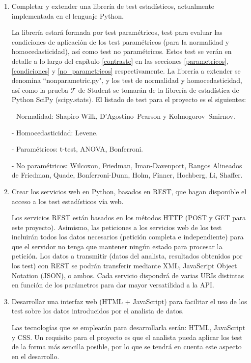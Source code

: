 \begin{enumerate}
\item Completar y extender una librería de test estadísticos, actualmente implementada en el lenguaje Python.

La librería estará formada por test paramétricos, test para evaluar las condiciones de aplicación de los test
paramétricos (para la normalidad y homocedasticidad), así como test no paramétricos. Estos test se verán en
detalle a lo largo del capítulo \ref{contraste} en las secciones \ref{parametricos}, \ref{condiciones} y
\ref{no_parametricos} respectivamente. La librería a extender se denomina ``nonparametric.py", y los test de
normalidad y homocedasticidad, así como la prueba  $\mathcal{T}$ de Student se tomarán de la librería de estadística
de Python SciPy (scipy.stats). El listado de test para el proyecto es el siguientes:

- Normalidad: Shapiro-Wilk, D’Agostino–Pearson y Kolmogorov–Smirnov.

- Homocedasticidad: Levene.

- Paramétricos: t-test, ANOVA, Bonferroni.

- No paramétricos: Wilcoxon, Friedman, Iman-Davenport, Rangos Alineados de Friedman, Quade, Bonferroni-Dunn,
Holm, Finner, Hochberg, Li, Shaffer.

\item Crear los servicios web en Python, basados en REST, que hagan disponible el acceso a los
test estadísticos vía web.

Los servicios REST están basados en los métodos HTTP (POST y GET para este proyecto). Asimismo, las peticiones
a los servicios web de los test incluirán todos los datos necesarios (petición completa e independiente) para
que el servidor no tenga que mantener ningún estado para procesar la petición. Los datos a transmitir (datos del
analista, resultados obtenidos por los test) con REST se podrán transferir mediante XML, JavaScript Object
Notation (JSON), o ambos. Cada servicio dispondrá de varias URIs distintas en función de los parámetros para dar
mayor versatilidad a la API.

\item Desarrollar una interfaz web (HTML + JavaScript) para facilitar el uso de los test sobre los
datos introducidos por el analista de datos.

Las tecnologías que se emplearán para desarrollarla serán: HTML, JavaScript y CSS. Un requisito para el proyecto
es que el analista pueda aplicar los test de la forma más sencilla posible, por lo que se tendrá en cuenta este
aspecto en el desarrollo.
\end{enumerate}


